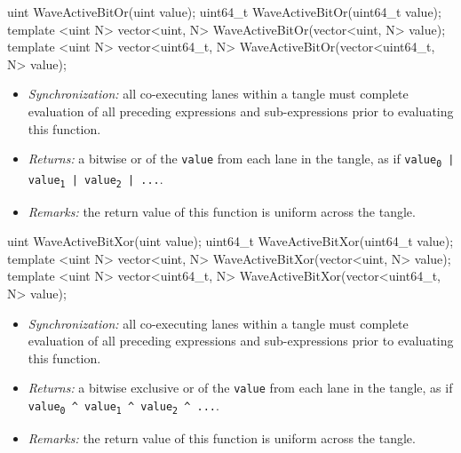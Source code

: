 \begin{HLSL}
uint WaveActiveBitOr(uint value);
uint64_t WaveActiveBitOr(uint64_t value);
template <uint N> vector<uint, N> WaveActiveBitOr(vector<uint, N> value);
template <uint N> vector<uint64_t, N> WaveActiveBitOr(vector<uint64_t, N> value);
\end{HLSL}

\begin{itemize}
  \item \textit{Synchronization:} all co-executing \gls{lane}s within a \gls{tangle}
  must complete evaluation of all preceding expressions and sub-expressions
  prior to evaluating this function.
  \item \textit{Returns:} a bitwise or of the \texttt{value} from each
  \gls{lane} in the \gls{tangle}, as if \texttt{value\textsubscript{0} |
  value\textsubscript{1} | value\textsubscript{2} | ...}.
  \item \textit{Remarks:} the return value of this function is uniform across
  the \gls{tangle}.
\end{itemize}

\begin{HLSL}
uint WaveActiveBitXor(uint value);
uint64_t WaveActiveBitXor(uint64_t value);
template <uint N> vector<uint, N> WaveActiveBitXor(vector<uint, N> value);
template <uint N> vector<uint64_t, N> WaveActiveBitXor(vector<uint64_t, N> value);
\end{HLSL}

\begin{itemize}
  \item \textit{Synchronization:} all co-executing \gls{lane}s within a \gls{tangle}
  must complete evaluation of all preceding expressions and sub-expressions
  prior to evaluating this function.
  \item \textit{Returns:} a bitwise exclusive or of the \texttt{value} from each
  \gls{lane} in the \gls{tangle}, as if \texttt{value\textsubscript{0} \^{}
  value\textsubscript{1} \^{} value\textsubscript{2} \^{} ...}.
  \item \textit{Remarks:} the return value of this function is uniform across
  the \gls{tangle}.
\end{itemize}

